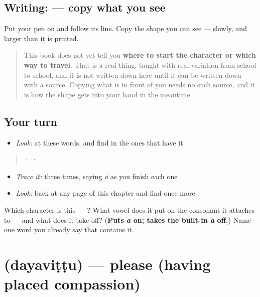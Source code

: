 \subsection*{Writing:  — copy what you see}
Put your pen on  and follow its line. Copy the shape you can see — slowly, and larger than it is printed.

\begin{quote}
This book does not yet tell you \textbf{where to start the character or which way to travel}. That is a real thing, taught with real variation from school to school, and it is not written down here until it can be written down with a source. Copying what is in front of you needs no such source, and it is how the shape gets into your hand in the meantime.
\end{quote}

\subsection*{Your turn}
\begin{itemize}
\raggedright
  \item \emph{Look:} at these words, and find  in the ones that have it
\end{itemize}

\begin{quote}
  ·    ·  
\end{quote}

\begin{itemize}
\raggedright
  \item \emph{Trace it:}  three times, saying \emph{ā} as you finish each one
  \item \emph{Look:} back at any page of this chapter and find  once more
\end{itemize}

\begin{tcolorbox}[breakable,colback=teal!4,colframe=teal!35!black,title={Before you move on}]
Which character is this — ? What vowel does it put on the consonant it attaches to — and what does it take off? (\textbf{Puts \emph{ā} on; takes the built-in \emph{a} off.}) Name one word you already say that contains it.
\end{tcolorbox}
\section[\texorpdfstring{\kn{ದಯವಿಟ್ಟು} (dayaviṭṭu)}{ದಯವಿಟ್ಟು (dayaviṭṭu)}]{ (dayaviṭṭu) — please (having placed compassion)}

